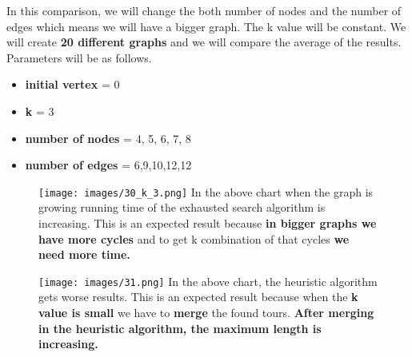\documentclass{beamer}
\begin{document}
\begin{projecttimeline2}

In this comparison, we will change the both number of nodes and the number of edges which means we will have a bigger graph. The k value will be constant. We will create \textbf{20 different graphs} and we will compare the average of the results.
\newline
\newline
Parameters will be as follows.
\vspace{0.03\textheight}
\begin{itemize}
 \item \textbf{initial vertex} = 0 
 \vspace{0.02\textheight}
 \item \textbf{k} = 3
 \vspace{0.02\textheight}
 \item \textbf{number of nodes} = 4, 5, 6, 7, 8
 \vspace{0.02\textheight}
 \item \textbf{number of edges} = 6,9,10,12,12
\end{itemize}
 
\end{projecttimeline2}

\begin{projecttimeline3}

\begin{figure}
    \texttt{[image: images/30\_k\_3.png]}
    In the above chart when the graph is growing running time of the exhausted search algorithm is increasing. This is an expected result because \textbf{in bigger graphs we have more cycles} and to get k combination of that cycles \textbf{we need more time.}
\end{figure}
	
\end{projecttimeline3}

\begin{projecttimeline4}

\begin{figure}
		    
    \texttt{[image: images/31.png]}
    In the above chart, the heuristic algorithm gets worse results. This is an expected result because when the \textbf{k value is small} we have to \textbf{merge} the found tours. \textbf{After merging in the heuristic algorithm, the maximum length is increasing.}
    
\end{figure}
 
\end{projecttimeline4}
\end{document}

